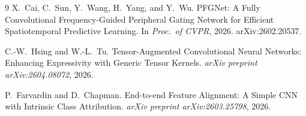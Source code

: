 \documentclass[10pt]{article}
\begin{document}
\begin{thebibliography}{9}
X.~Cai, C.~Sun, Y.~Wang, H.~Yang, and Y.~Wu.
\newblock PFGNet: A Fully Convolutional Frequency-Guided Peripheral Gating
Network for Efficient Spatiotemporal Predictive Learning.
\newblock In \emph{Proc.\ of CVPR}, 2026. arXiv:2602.20537.

C.-W.~Hsing and W.-L.~Tu.
\newblock Tensor-Augmented Convolutional Neural Networks: Enhancing Expressivity
with Generic Tensor Kernels.
\newblock \emph{arXiv preprint arXiv:2604.08072}, 2026.

P.~Farvardin and D.~Chapman.
\newblock End-to-end Feature Alignment: A Simple CNN with Intrinsic Class
Attribution.
\newblock \emph{arXiv preprint arXiv:2603.25798}, 2026.

\end{thebibliography}
\end{document}
